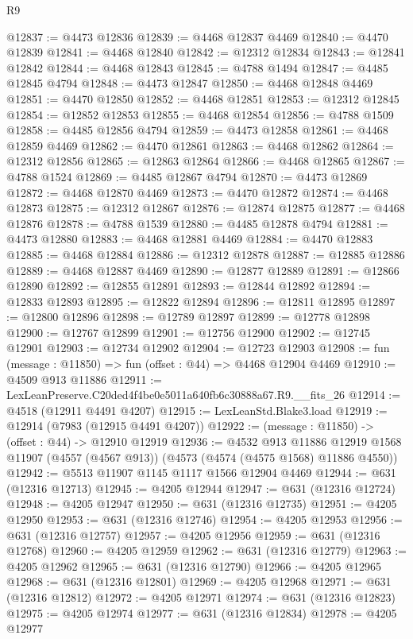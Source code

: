 \begin{lexlean}{R9}
\begin{coremodule}
@12837 := @4473 @12836
@12839 := @4468 @12837 @4469
@12840 := @4470 @12839
@12841 := @4468 @12840
@12842 := @12312 @12834
@12843 := @12841 @12842
@12844 := @4468 @12843
@12845 := @4788 @1494
@12847 := @4485 @12845 @4794
@12848 := @4473 @12847
@12850 := @4468 @12848 @4469
@12851 := @4470 @12850
@12852 := @4468 @12851
@12853 := @12312 @12845
@12854 := @12852 @12853
@12855 := @4468 @12854
@12856 := @4788 @1509
@12858 := @4485 @12856 @4794
@12859 := @4473 @12858
@12861 := @4468 @12859 @4469
@12862 := @4470 @12861
@12863 := @4468 @12862
@12864 := @12312 @12856
@12865 := @12863 @12864
@12866 := @4468 @12865
@12867 := @4788 @1524
@12869 := @4485 @12867 @4794
@12870 := @4473 @12869
@12872 := @4468 @12870 @4469
@12873 := @4470 @12872
@12874 := @4468 @12873
@12875 := @12312 @12867
@12876 := @12874 @12875
@12877 := @4468 @12876
@12878 := @4788 @1539
@12880 := @4485 @12878 @4794
@12881 := @4473 @12880
@12883 := @4468 @12881 @4469
@12884 := @4470 @12883
@12885 := @4468 @12884
@12886 := @12312 @12878
@12887 := @12885 @12886
@12889 := @4468 @12887 @4469
@12890 := @12877 @12889
@12891 := @12866 @12890
@12892 := @12855 @12891
@12893 := @12844 @12892
@12894 := @12833 @12893
@12895 := @12822 @12894
@12896 := @12811 @12895
@12897 := @12800 @12896
@12898 := @12789 @12897
@12899 := @12778 @12898
@12900 := @12767 @12899
@12901 := @12756 @12900
@12902 := @12745 @12901
@12903 := @12734 @12902
@12904 := @12723 @12903
@12908 := fun (message : @11850) => fun (offset : @44) => @4468 @12904 @4469
@12910 := @4509 @913 @11886
@12911 := LexLeanPreserve.C20ded4f4be0e5011a640fb6c30888a67.R9.__fits_26
@12914 := @4518 (@12911 @4491 @4207)
@12915 := LexLeanStd.Blake3.load
@12919 := @12914 (@7983 (@12915 @4491 @4207))
@12922 := (message : @11850) -> (offset : @44) -> @12910 @12919
@12936 := @4532
    @913
    @11886
    @12919
    @1568
    @11907
    (@4557 (@4567 @913))
    (@4573 (@4574 (@4575 @1568) @11886 @4550))
@12942 := @5513 @11907 @1145 @1117 @1566 @12904 @4469
@12944 := @631 (@12316 @12713)
@12945 := @4205 @12944
@12947 := @631 (@12316 @12724)
@12948 := @4205 @12947
@12950 := @631 (@12316 @12735)
@12951 := @4205 @12950
@12953 := @631 (@12316 @12746)
@12954 := @4205 @12953
@12956 := @631 (@12316 @12757)
@12957 := @4205 @12956
@12959 := @631 (@12316 @12768)
@12960 := @4205 @12959
@12962 := @631 (@12316 @12779)
@12963 := @4205 @12962
@12965 := @631 (@12316 @12790)
@12966 := @4205 @12965
@12968 := @631 (@12316 @12801)
@12969 := @4205 @12968
@12971 := @631 (@12316 @12812)
@12972 := @4205 @12971
@12974 := @631 (@12316 @12823)
@12975 := @4205 @12974
@12977 := @631 (@12316 @12834)
@12978 := @4205 @12977

\end{coremodule}
\end{lexlean}
